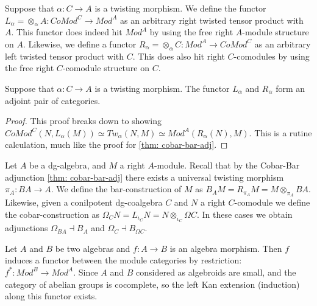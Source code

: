 \documentclass[../thesis.tex]{subfiles}
\begin{document}
            Suppose that $\alpha : C \rightarrow A$ is a twisting morphism. We define the functor $L_\alpha = \otimes_\alpha A : CoMod^C \rightarrow Mod^A$ as an arbitrary right twisted tensor product with $A$. This functor does indeed hit $Mod^A$ by using the free right $A$-module structure on $A$. Likewise, we define a functor $R_\alpha = \otimes_\alpha C : Mod^A \rightarrow CoMod^C$ as an arbitrary left twisted tensor product with $C$. This does also hit right $C$-comodules by using the free right $C$-comodule structure on $C$.

            \begin{proposition}
                Suppose that $\alpha : C \rightarrow A$ is a twisting morphism. The functor $L_\alpha$ and $R_\alpha$ form an adjoint pair of categories.
                \begin{center}
                \end{center}
            \end{proposition}

            \begin{proof}
                This proof breaks down to showing $CoMod^C(N, L_\alpha(M))\simeq Tw_\alpha(N,M) \simeq Mod^A(R_\alpha(N),M)$. This is a rutine calculation, much like the proof for \ref{thm: cobar-bar-adj}.
            \end{proof}

            Let $A$ be a dg-algebra, and $M$ a right $A$-module. Recall that by the Cobar-Bar adjunction \ref{thm: cobar-bar-adj} there exists a universal twisting morphism $\pi_A : BA \rightarrow A$. We define the bar-construction of $M$ as $B_AM = R_{\pi_A}M = M\otimes_{\pi_A}BA$. Likewise, given a conilpotent dg-coalgebra $C$ and $N$ a right $C$-comodule we define the cobar-construction as $\Omega_CN = L_{\iota_C}N = N\otimes_{\iota_C}\Omega C$. In these cases we obtain adjunctions $\Omega_{BA} \dashv B_A$ and $\Omega_C \dashv B_{\Omega C}$.

            Let $A$ and $B$ be two algebras and $f : A \rightarrow B$ is an algebra morphism. Then $f$ induces a functor between the module categories by restriction: $f^* : Mod^B \rightarrow Mod^A$. Since $A$ and $B$ considered as algebroids are small, and the category of abelian groups is cocomplete, so the left Kan extension (induction) along this functor exists.
            \begin{center}
            \end{center}
\end{document}
